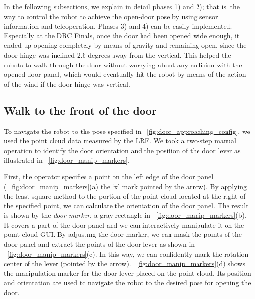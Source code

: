 

In the following subsections, we explain in detail phases 1) and 2); that is,
the way to control the robot to achieve the open-door pose by using sensor information
and teleoperation.
Phases 3) and 4) can be easily implemented. 
Especially at the DRC Finals, once the door had been opened wide enough, it ended up opening
completely by means of gravity and remaining open, since the door hinge was inclined 2.6 degrees
away from the vertical.
This helped the robots to walk through the door without worrying about any collision with
the opened door panel, which would eventually hit the robot by means of the action of the wind if the door hinge 
was vertical. 

\subsection{Walk to the front of the door}
%
To navigate the robot to the pose specified in \figurename~\ref{fig:door_approaching_config},
we used the point cloud data measured by the LRF. 
We took a two-step manual operation to identify the door orientation and the position of the
door lever as illustrated in \figurename~\ref{fig:door_manip_markers}.

First, the operator specifies a point on the left edge of the door panel
(\figurename~\ref{fig:door_manip_markers}(a) the `x' mark pointed by the arrow).
By applying the least square method to the portion of the point cloud located at the right of
the specified point, we can calculate the orientation of the door panel.
The result is shown by the {\it door marker}, a gray rectangle in
\figurename~\ref{fig:door_manip_markers}(b).
It covers a part of the door panel and we can interactively manipulate it on the point cloud GUI.
By adjusting the door marker, we can mask the points of the door panel and extract the points of
the door lever as shown in \figurename~\ref{fig:door_manip_markers}(c).
In this way, we can confidently mark the rotation center of the lever (pointed by the arrow).
\figurename~\ref{fig:door_manip_markers}(d) shows the manipulation marker for the door lever
placed on the point cloud.
Its position and orientation are used to navigate the robot to the desired pose for opening
the door.


